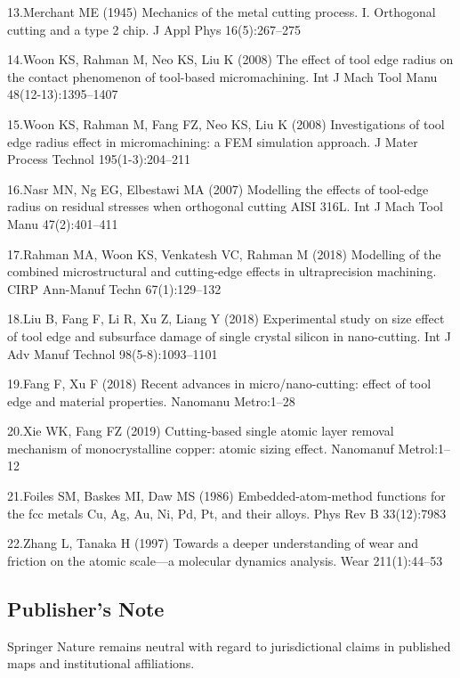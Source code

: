 \documentclass{article}
\begin{document}
\begin{hangpars}
13.\quad Merchant ME (1945) Mechanics of the metal cutting process. I. Orthogonal cutting and a type 2 chip. J Appl Phys 16(5):267–275

14.\quad Woon KS, Rahman M, Neo KS, Liu K (2008) The effect of tool edge radius on the contact phenomenon of tool-based micromachining. Int J Mach Tool Manu 48(12-13):1395–1407

15.\quad Woon KS, Rahman M, Fang FZ, Neo KS, Liu K (2008) Investigations of tool edge radius effect in micromachining: a FEM simulation approach. J Mater Process Technol 195(1-3):204–211

16.\quad Nasr MN, Ng EG, Elbestawi MA (2007) Modelling the effects of tool-edge radius on residual stresses when orthogonal cutting AISI 316L. Int J Mach Tool Manu 47(2):401–411

17.\quad Rahman MA, Woon KS, Venkatesh VC, Rahman M (2018) Modelling of the combined microstructural and cutting-edge effects in ultraprecision machining. CIRP Ann-Manuf Techn 67(1):129–132

18.\quad Liu B, Fang F, Li R, Xu Z, Liang Y (2018) Experimental study on size effect of tool edge and subsurface damage of single crystal silicon in nano-cutting. Int J Adv Manuf Technol 98(5-8):1093–1101

19.\quad Fang F, Xu F (2018) Recent advances in micro/nano-cutting: effect of tool edge and material properties. Nanomanu Metro:1–28

20.\quad Xie WK, Fang FZ (2019) Cutting-based single atomic layer removal mechanism of monocrystalline copper: atomic sizing effect. Nanomanuf Metrol:1–12

21.\quad Foiles SM, Baskes MI, Daw MS (1986) Embedded-atom-method functions for the fcc metals Cu, Ag, Au, Ni, Pd, Pt, and their alloys. Phys Rev B 33(12):7983

22.\quad Zhang L, Tanaka H (1997) Towards a deeper understanding of wear and friction on the atomic scale—a molecular dynamics analysis. Wear 211(1):44–53
\end{hangpars}

\subsection*{Publisher’s Note}
Springer Nature remains neutral with regard to jurisdictional claims in published maps and institutional affiliations.
\end{document}
